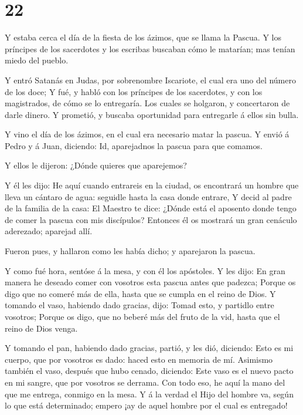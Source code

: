 \hypertarget{section-21}{%
\section{22}\label{section-21}}

 Y estaba cerca el día de la fiesta de los ázimos, que se
llama la Pascua.  Y los príncipes de los sacerdotes y los
escribas buscaban cómo le matarían; mas tenían miedo del pueblo.

 Y entró Satanás en Judas, por sobrenombre Iscariote, el
cual era uno del número de los doce;  Y fué, y habló con los
príncipes de los sacerdotes, y con los magistrados, de cómo se lo
entregaría.  Los cuales se holgaron, y concertaron de darle
dinero.  Y prometió, y buscaba oportunidad para entregarle á
ellos sin bulla.

 Y vino el día de los ázimos, en el cual era necesario matar
la pascua.  Y envió á Pedro y á Juan, diciendo: Id,
aparejadnos la pascua para que comamos.

 Y ellos le dijeron: ¿Dónde quieres que aparejemos?

 Y él les dijo: He aquí cuando entrareis en la ciudad, os
encontrará un hombre que lleva un cántaro de agua: seguidle hasta la
casa donde entrare,  Y decid al padre de la familia de la
casa: El Maestro te dice: ¿Dónde está el aposento donde tengo de comer
la pascua con mis discípulos?  Entonces él os mostrará un
gran cenáculo aderezado; aparejad allí.

 Fueron pues, y hallaron como les había dicho; y aparejaron
la pascua.

 Y como fué hora, sentóse á la mesa, y con él los
apóstoles.  Y les dijo: En gran manera he deseado comer con
vosotros esta pascua antes que padezca;  Porque os digo que
no comeré más de ella, hasta que se cumpla en el reino de Dios.
 Y tomando el vaso, habiendo dado gracias, dijo: Tomad
esto, y partidlo entre vosotros;  Porque os digo, que no
beberé más del fruto de la vid, hasta que el reino de Dios venga.

 Y tomando el pan, habiendo dado gracias, partió, y les
dió, diciendo: Esto es mi cuerpo, que por vosotros es dado: haced esto
en memoria de mí.  Asimismo también el vaso, después que
hubo cenado, diciendo: Este vaso es el nuevo pacto en mi sangre, que por
vosotros se derrama.  Con todo eso, he aquí la mano del que
me entrega, conmigo en la mesa.  Y á la verdad el Hijo del
hombre va, según lo que está determinado; empero ¡ay de aquel hombre por
el cual es entregado!

